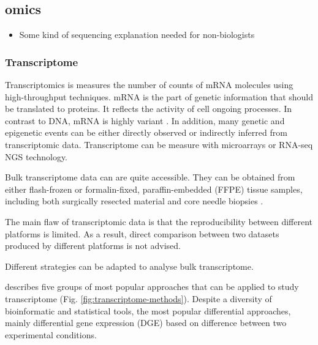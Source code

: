 \documentclass[12pt,]{book}
\providecommand{\tightlist}{%
  \setlength{\itemsep}{0pt}\setlength{\parskip}{0pt}}
\theoremstyle{definition}
\theoremstyle{definition}
\theoremstyle{definition}
\theoremstyle{remark}
\begin{document}
\hypertarget{omics}{%
\subsection{omics}\label{omics}}

\begin{itemize}
\tightlist
\item
  Some kind of sequencing explanation needed for non-biologists
\end{itemize}

\hypertarget{transcriptome}{%
\subsubsection{Transcriptome}\label{transcriptome}}

Transcriptomics is measures the number of counts of mRNA molecules using
high-throughput techniques. mRNA is the part of genetic information that
should be translated to proteins. It reflects the activity of cell
ongoing processes. In contrast to DNA, mRNA is highly variant
\citep{Velculescu1997}. In addition, many genetic and epigenetic events
can be either directly observed or indirectly inferred from
transcriptomic data. Transcriptome can be measure with microarrays or
RNA-seq NGS technology.

Bulk transcriptome data can are quite accessible. They can be obtained
from either flash-frozen or formalin-fixed, paraffin-embedded (FFPE)
tissue samples, including both surgically resected material and core
needle biopsies \citep{Schelker2017}.

The main flaw of transcriptomic data is that the reproducibility between
different platforms is limited. As a result, direct comparison between
two datasets produced by different platforms is not advised.

Different strategies can be adapted to analyse bulk transcriptome.

\citet{Cieslik2017} describes five groups of most popular approaches
that can be applied to study transcriptome (Fig.
\ref{fig:transcriptome-methods}). Despite a diversity of bioinformatic
and statistical tools, the most popular differential approaches, mainly
differential gene expression (DGE) based on difference between two
experimental conditions.
\end{document}

